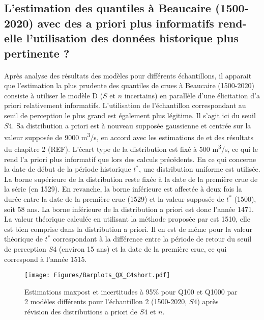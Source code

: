 \documentclass[11pt]{article}
\begin{document}
	 \subsection{L'estimation des quantiles à Beaucaire (1500-2020) avec des a priori plus informatifs rend-elle l'utilisation des données historique plus pertinente ?}


	\paragraph{} Après analyse des résultats des modèles pour différents échantillons, il apparait que l'estimation la plus prudente des quantiles de crues à Beaucaire (1500-2020) consiste à utiliser le modèle D ($S$ et $n$ incertains) en parallèle d'une élicitation d'a priori relativement informatifs. L'utilisation de l'échantillon correspondant au seuil de perception le plus grand est également plus légitime. Il s'agit ici du seuil $S4$. Sa distribution a priori est à nouveau supposée gaussienne et centrée sur la valeur supposée de 9000 m\textsuperscript{3}/s, en accord avec les estimations de \citet{pichard_hydro-climatology_2017} et des résultats du chapitre 2 (REF). L'écart type de la distribution est fixé à 500 m\textsuperscript{3}/s, ce qui le rend l'a priori plus informatif que lors des calculs précédents. En ce qui concerne la date de début de la période historique $t^{*}$, une distribution uniforme est utilisée. La borne supérieure de la distribution reste fixée à la date de la première crue de la série (en 1529). En revanche, la borne inférieure est affectée à deux fois la durée entre la date de la première crue (1529) et la valeur supposée de $t^{*}$ (1500), soit 58 ans. La borne inférieure de la distribution a priori est donc l'année 1471. La valeur théorique calculée en utilisant la méthode proposée par \citet{prosdocimi_german_2018} est 1510, elle est bien comprise dans la distribution a priori. Il en est de même pour la valeur théorique de $t^{*}$ correspondant à la différence entre la période de retour du seuil de perception $S4$ (environ 15 ans) et la date de la première crue, ce qui correspond à l'année 1515.

	\begin{figure}[h]
		\centering
		\texttt{[image: Figures/Barplots\_QX\_C4short.pdf]}
		\caption{Estimations maxpost et incertitudes à 95\% pour Q100 et Q1000 par 2 modèles différents pour l'échantillon 2 (1500-2020, $S4$) après révision des distributions a priori de $S4$ et $n$.}
		\label{fig:BarplotC4short}
	\end{figure}
\end{document}
